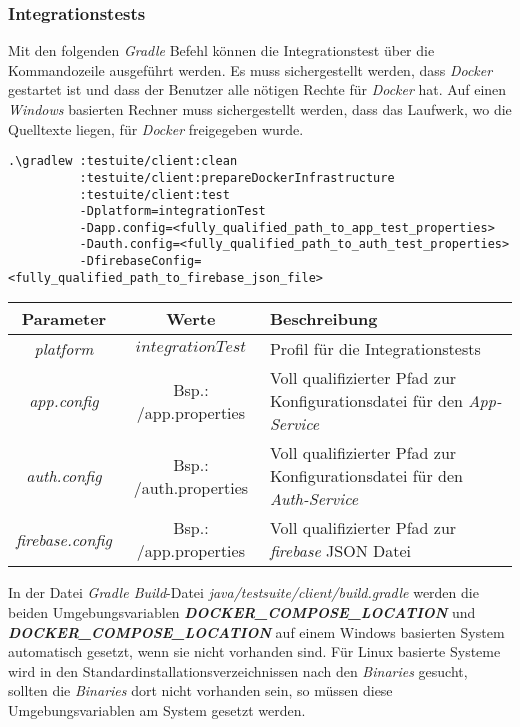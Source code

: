 \documentclass[]{article}
\begin{document}
{{{\subsubsection{Integrationstests}
Mit den folgenden \emph{Gradle} Befehl können die Integrationstest über die Kommandozeile ausgeführt werden. Es muss sichergestellt werden, dass \emph{Docker} gestartet ist und dass der Benutzer alle nötigen Rechte für \emph{Docker} hat. Auf einen \emph{Windows} basierten Rechner muss sichergestellt werden, dass das Laufwerk, wo die Quelltexte liegen, für \emph{Docker} freigegeben wurde. 
\begin{verbatim}
.\gradlew :testuite/client:clean 
          :testuite/client:prepareDockerInfrastructure 
          :testuite/client:test
          -Dplatform=integrationTest
          -Dapp.config=<fully_qualified_path_to_app_test_properties> 
          -Dauth.config=<fully_qualified_path_to_auth_test_properties> 
          -DfirebaseConfig=<fully_qualified_path_to_firebase_json_file>
\end{verbatim}
{\renewcommand{\arraystretch}{2}%
\begin{center}
	\begin{tabular}{| c | c | p{8.3cm} |}
		\hline
		\textbf{Parameter} & \textbf{Werte} & \textbf{Beschreibung}  \\ \hline
		\textit{platform} & $integrationTest$ & Profil für die Integrationstests\\ \hline
		\textit{app.config} & Bsp.: /app.properties & Voll qualifizierter Pfad zur Konfigurationsdatei für den \emph{App-Service}  \\ \hline
		\textit{auth.config} & Bsp.: /auth.properties & Voll qualifizierter Pfad zur Konfigurationsdatei für den \emph{Auth-Service}  \\ \hline
		\textit{firebase.config} & Bsp.: /app.properties & Voll qualifizierter Pfad zur 
		\emph{firebase} JSON Datei  \\ \hline
	\end{tabular}
\end{center}
In der Datei \emph{Gradle Build}-Datei \emph{java/testsuite/client/build.gradle} werden die beiden Umgebungsvariablen \textbf{\emph{DOCKER\_COMPOSE\_LOCATION}} und  \textbf{\emph{DOCKER\_COMPOSE\_LOCATION}} auf einem Windows basierten System automatisch gesetzt, wenn sie nicht vorhanden sind. Für Linux basierte Systeme wird in den Standardinstallationsverzeichnissen nach den \emph{Binaries} gesucht, sollten die \emph{Binaries} dort nicht vorhanden sein, so müssen diese Umgebungsvariablen am System gesetzt werden. 

}}}}
\end{document}
